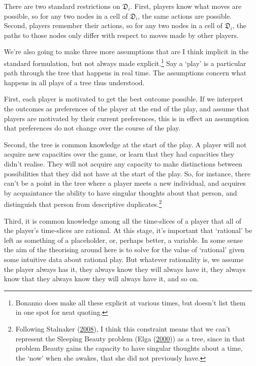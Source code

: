 \documentclass[
  12pt,
  letterpaper,
  DIV=11,
  numbers=noendperiod]{scrreprt}
\begin{document}
There are two standard restrictions on \(\mathfrak{D}_i\). First,
players know what moves are possible, so for any two nodes in a cell of
\(\mathfrak{D}_i\), the same actions are possible. Second, players
remember their actions, so for any two nodes in a cell of
\(\mathfrak{D}_i\), the paths to those nodes only differ with respect to
moves made by other players.

We're also going to make three more assumptions that are I think
implicit in the standard formulation, but not always made
explicit.\footnote{Bonanno does make all these explicit at various
  times, but doesn't list them in one spot for neat quoting.} Say a
`play' is a particular path through the tree that happens in real time.
The assumptions concern what happens in all plays of a tree thus
understood.

First, each player is motivated to get the best outcome possible. If we
interpret the outcomes as preferences of the player at the end of the
play, and assume that players are motivated by their current
preferences, this is in effect an assumption that preferences do not
change over the course of the play.

Second, the tree is common knowledge at the start of the play. A player
will not acquire new capacities over the game, or learn that they had
capacities they didn't realise. They will not acquire any capacity to
make distinctions between possibilities that they did not have at the
start of the play. So, for instance, there can't be a point in the tree
where a player meets a new individual, and acquires by acquaintance the
ability to have singular thoughts about that person, and distinguish
that person from descriptive duplicates.\footnote{Following Stalnaker
  (\protect\hyperlink{ref-Stalnaker2008}{2008}), I think this constraint
  means that we can't represent the Sleeping Beauty problem (Elga
  (\protect\hyperlink{ref-Elga2000}{2000})) as a tree, since in that
  problem Beauty gains the capacity to have singular thoughts about a
  time, the `now' when she awakes, that she did not previously have.}

Third, it is common knowledge among all the time-slices of a player that
all of the player's time-slices are rational. At this stage, it's
important that `rational' be left as something of a placeholder, or,
perhaps better, a variable. In some sense the aim of the theorising
around here is to solve for the value of `rational' given some intuitive
data about rational play. But whatever rationality is, we assume the
player always has it, they always know they will always have it, they
always know that they always know they will always have it, and so on.
\end{document}
